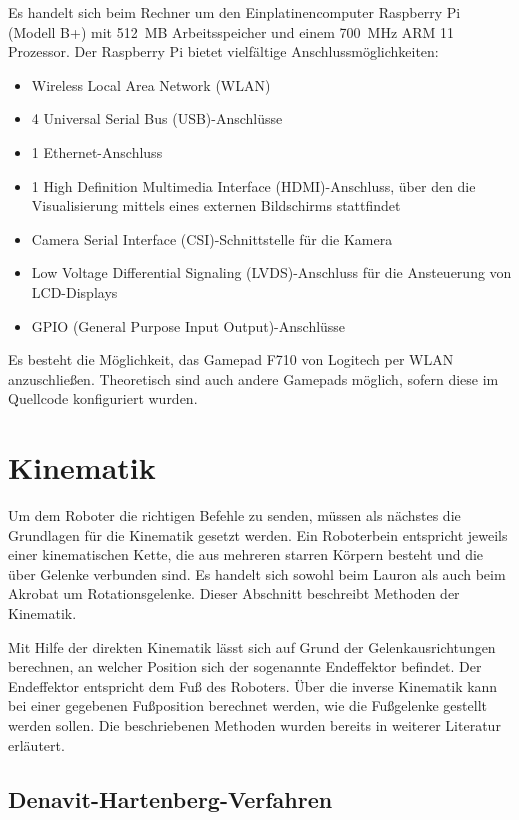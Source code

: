 Es handelt sich beim Rechner um den Einplatinencomputer Raspberry Pi (Modell B+) mit \SI{512}{MB} Arbeitsspeicher und einem \SI{700}{MHz} ARM 11 Prozessor. Der Raspberry Pi bietet vielfältige Anschlussmöglichkeiten:
\begin{itemize}
\item Wireless Local Area Network (WLAN)
\item 4 Universal Serial Bus (USB)-Anschlüsse
\item 1 Ethernet-Anschluss
\item 1 High Definition Multimedia Interface (HDMI)-Anschluss, über den die Visualisierung mittels eines externen Bildschirms stattfindet
\item Camera Serial Interface (CSI)-Schnittstelle für die Kamera
\item Low Voltage Differential Signaling (LVDS)-Anschluss für die Ansteuerung von LCD-Displays
\item GPIO (General Purpose Input Output)-Anschlüsse
\end{itemize}

Es besteht die Möglichkeit, das Gamepad F710 von Logitech per WLAN anzuschließen. Theoretisch sind auch andere Gamepads möglich, sofern diese im Quellcode konfiguriert wurden.

\section{Kinematik}

Um dem Roboter die richtigen Befehle zu senden, müssen als nächstes die Grundlagen für die Kinematik gesetzt werden. Ein Roboterbein entspricht jeweils einer kinematischen Kette, die aus mehreren starren Körpern besteht und die über Gelenke verbunden sind. Es handelt sich sowohl beim Lauron als auch beim Akrobat um Rotationsgelenke. Dieser Abschnitt beschreibt Methoden der Kinematik.

Mit Hilfe der direkten Kinematik lässt sich auf Grund der Gelenkausrichtungen berechnen, an welcher Position sich der sogenannte Endeffektor befindet. Der Endeffektor entspricht dem Fuß des Roboters. Über die inverse Kinematik kann bei einer gegebenen Fußposition berechnet werden, wie die Fußgelenke gestellt werden sollen. Die beschriebenen Methoden wurden bereits in weiterer Literatur erläutert. \autocite{den55, wloka92, ihme02, fellmann2007}

\subsection{Denavit-Hartenberg-Verfahren}

